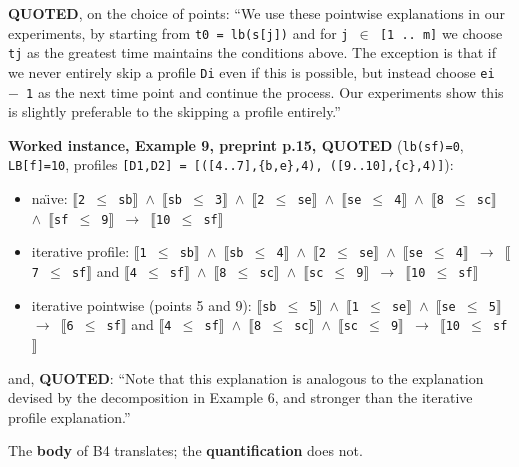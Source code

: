 \documentclass[10pt,a4paper]{article}
\newcommand{\provtag}[2]{{\small\sffamily\bfseries\textcolor{#1}{#2}}}
\newenvironment{pubblock}{%
  \par\smallskip
  \def\FrameCommand{\textcolor{litbar}{\vrule width 2.5pt}\hspace{9pt}}%
  \MakeFramed{\advance\hsize-\width\FrameRestore}}%
  {\endMakeFramed\par\smallskip}
\newcommand{\litsub}[1]{\par\smallskip{\sffamily\bfseries\textcolor{litbar}{#1}\par}}
\begin{document}
\begin{pubblock}
\provtag{tagquoted}{QUOTED}, on the choice of points: ``We use these pointwise explanations in our experiments, by starting from \texttt{t0 = lb(s[j])} and for \texttt{j $\in$ [1 .. m]} we choose \texttt{tj} as the greatest time maintains the conditions above. The exception is that if we never entirely skip a profile \texttt{Di} even if this is possible, but instead choose \texttt{ei $-$ 1} as the next time point and continue the process. Our experiments show this is slightly preferable to the skipping a profile entirely.''

\textbf{Worked instance, Example 9, preprint p.15, \provtag{tagquoted}{QUOTED}} (\texttt{lb(sf)=0}, \texttt{LB[f]=10}, profiles \texttt{[D1,D2] = [([4.\allowbreak{}.\allowbreak{}7],\{b,e\},4), ([9.\allowbreak{}.\allowbreak{}10],\{c\},4)]}):

\begin{itemize}\setlength{\itemsep}{0pt}
\item na\"{\i}ve: \texttt{$\llbracket$2 $\leq$ sb$\rrbracket$ $\wedge$ $\llbracket$sb $\leq$ 3$\rrbracket$ $\wedge$ $\llbracket$2 $\leq$ se$\rrbracket$ $\wedge$ $\llbracket$se $\leq$ 4$\rrbracket$ $\wedge$ $\llbracket$8 $\leq$ sc$\rrbracket$ $\wedge$ $\llbracket$sf $\leq$ 9$\rrbracket$ $\rightarrow$ $\llbracket$10 $\leq$ sf$\rrbracket$}
\item iterative profile: \texttt{$\llbracket$1 $\leq$ sb$\rrbracket$ $\wedge$ $\llbracket$sb $\leq$ 4$\rrbracket$ $\wedge$ $\llbracket$2 $\leq$ se$\rrbracket$ $\wedge$ $\llbracket$se $\leq$ 4$\rrbracket$ $\rightarrow$ $\llbracket$7 $\leq$ sf$\rrbracket$} and \texttt{$\llbracket$4 $\leq$ sf$\rrbracket$ $\wedge$ $\llbracket$8 $\leq$ sc$\rrbracket$ $\wedge$ $\llbracket$sc $\leq$ 9$\rrbracket$ $\rightarrow$ $\llbracket$10 $\leq$ sf$\rrbracket$}
\item iterative pointwise (points 5 and 9): \texttt{$\llbracket$sb $\leq$ 5$\rrbracket$ $\wedge$ $\llbracket$1 $\leq$ se$\rrbracket$ $\wedge$ $\llbracket$se $\leq$ 5$\rrbracket$ $\rightarrow$ $\llbracket$6 $\leq$ sf$\rrbracket$} and \texttt{$\llbracket$4 $\leq$ sf$\rrbracket$ $\wedge$ $\llbracket$8 $\leq$ sc$\rrbracket$ $\wedge$ $\llbracket$sc $\leq$ 9$\rrbracket$ $\rightarrow$ $\llbracket$10 $\leq$ sf$\rrbracket$}
\end{itemize}
and, \provtag{tagquoted}{QUOTED}: ``Note that this explanation is analogous to the explanation devised by the decomposition in Example 6, and stronger than the iterative profile explanation.''

\par\smallskip
\litsub{Translation to this repo's notation}
The \textbf{body} of B4 translates; the \textbf{quantification} does not.


\end{pubblock}
\end{document}
